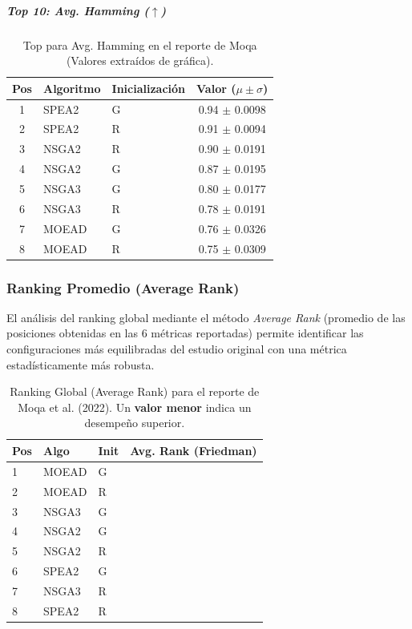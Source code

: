\documentclass[a4paper,10pt]{article}
\begin{document}
\subparagraph{Top 10: Avg. Hamming ($\uparrow$)}
\begin{table}[H]
    \centering
    \begin{tabular}{cllc}
        \toprule
        Pos & Algoritmo & Inicialización & Valor ($\mu \pm \sigma$) \\
        \midrule
        1 & SPEA2 & G & 0.94 $\pm$ 0.0098 \\
        2 & SPEA2 & R & 0.91 $\pm$ 0.0094 \\
        3 & NSGA2 & R & 0.90 $\pm$ 0.0191 \\
        4 & NSGA2 & G & 0.87 $\pm$ 0.0195 \\
        5 & NSGA3 & G & 0.80 $\pm$ 0.0177 \\
        6 & NSGA3 & R & 0.78 $\pm$ 0.0191 \\
        7 & MOEAD & G & 0.76 $\pm$ 0.0326 \\
        8 & MOEAD & R & 0.75 $\pm$ 0.0309 \\
        \bottomrule
    \end{tabular}
    \caption{Top para Avg. Hamming en el reporte de Moqa (Valores extraídos de gráfica).}
\end{table}

\subsubsection{Ranking Promedio (Average Rank)}
El análisis del ranking global mediante el método \textit{Average Rank} (promedio de las posiciones obtenidas en las 6 métricas reportadas) permite identificar las configuraciones más equilibradas del estudio original con una métrica estadísticamente más robusta.

\begin{table}[H]
    \centering
    \begin{tabular}{lllc}
        \toprule
        Pos & Algo & Init & Avg. Rank (Friedman) \\
        \midrule
        1 & MOEAD & G \\
        2 & MOEAD & R \\
        3 & NSGA3 & G \\
        4 & NSGA2 & G \\
        5 & NSGA2 & R \\
        6 & SPEA2 & G \\
        7 & NSGA3 & R \\
        8 & SPEA2 & R \\
        \bottomrule
    \end{tabular}
    \caption{Ranking Global (Average Rank) para el reporte de Moqa et al. (2022). Un \textbf{valor menor} indica un desempeño superior.}
\end{table}
\end{document}
